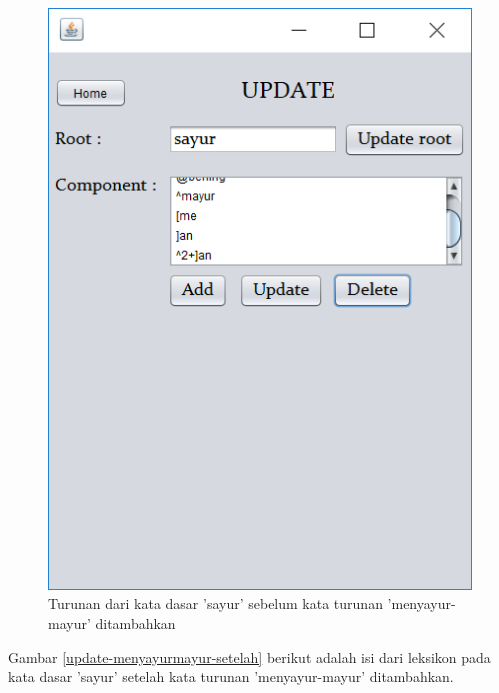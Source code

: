\begin{figure}[H]
\centering
\includegraphics[scale=0.7]{Gambar/update-menyayurmayur-sebelum}
\caption{Turunan dari kata dasar 'sayur' sebelum kata turunan 'menyayur-mayur' ditambahkan} 
\label{update-menyayurmayur-sebelum}
\end{figure}

Gambar \ref{update-menyayurmayur-setelah} berikut adalah isi dari leksikon pada kata dasar 'sayur' setelah kata turunan 'menyayur-mayur' ditambahkan.

